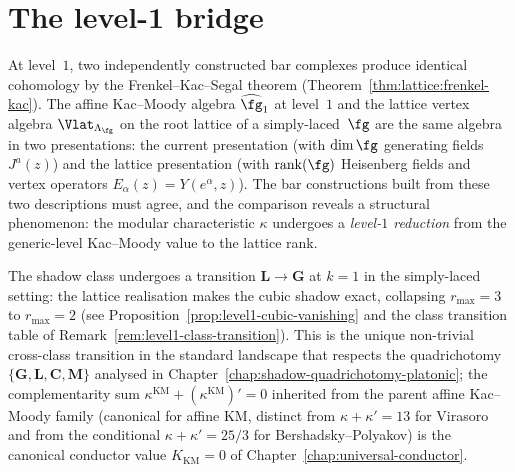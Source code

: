 
\chapter{The level-1 bridge}\label{chap:level1-bridge}

At level~$1$, two independently constructed bar complexes produce
identical cohomology by the Frenkel--Kac--Segal theorem
(Theorem~\ref{thm:lattice:frenkel-kac}). The affine Kac--Moody algebra
$\widehat{\fg}_1$ at level~$1$ and the lattice vertex algebra
$\Vlat_{\Lambda_\fg}$ on the root lattice of a simply-laced~$\fg$
are the same algebra in two presentations: the current presentation
(with $\dim\fg$ generating fields $J^a(z)$) and the lattice
presentation (with $\operatorname{rank}(\fg)$ Heisenberg fields
and vertex operators $E_\alpha(z) = Y(e^\alpha, z)$).
The bar constructions built from these two descriptions must
agree, and the comparison reveals a structural phenomenon:
the modular characteristic $\kappa$ undergoes a
\emph{level-$1$ reduction} from the generic-level Kac--Moody
value to the lattice rank.

The shadow class undergoes a transition
$\mathbf{L} \to \mathbf{G}$ at $k = 1$ in the simply-laced setting:
the lattice realisation makes the cubic shadow exact, collapsing
$r_{\max} = 3$ to $r_{\max} = 2$ \textup{(}see
Proposition~\ref{prop:level1-cubic-vanishing} and the class
transition table of
Remark~\ref{rem:level1-class-transition}\textup{)}. This is the
unique non-trivial cross-class transition in the standard
landscape that respects the quadrichotomy
$\{\mathbf{G},\mathbf{L},\mathbf{C},\mathbf{M}\}$ analysed in
Chapter~\ref{chap:shadow-quadrichotomy-platonic}; the
complementarity sum $\kappa^{\mathrm{KM}} + (\kappa^{\mathrm{KM}})' = 0$
inherited from the parent affine Kac--Moody family
\textup{(}canonical for affine KM, distinct from
$\kappa + \kappa' = 13$ for Virasoro and from
the conditional $\kappa + \kappa' = 25/3$ for
Bershadsky--Polyakov\textup{)} is the
canonical conductor value $K_{\mathrm{KM}} = 0$ of
Chapter~\ref{chap:universal-conductor}.

